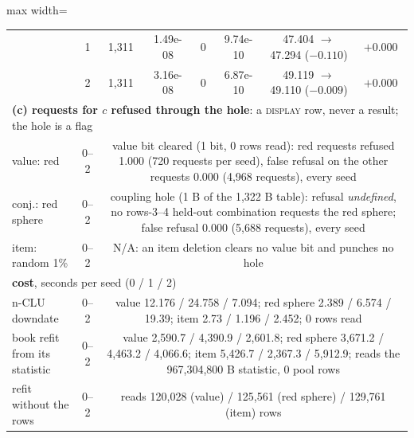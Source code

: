 \documentclass{article} %
\begin{document}
\begin{table}[t]
\begin{adjustbox}{max width=\linewidth}
\begin{tabular}{lccccccc}
 & 1 & 1,311 & 1.49e-08 & 0 & 9.74e-10 & 47.404 $\to$ 47.294 ($-0.110$) & $+0.000$ \\
 & 2 & 1,311 & 3.16e-08 & 0 & 6.87e-10 & 49.119 $\to$ 49.110 ($-0.009$) & $+0.000$ \\
\midrule
\multicolumn{8}{l}{\textbf{(c) requests for $c$ refused through the hole}: a \textsc{display} row, never a result; the hole is a flag} \\
value: red & 0--2 & \multicolumn{6}{p{10.6cm}}{value bit cleared (1 bit, 0 rows read): red requests refused 1.000 (720 requests per seed), false refusal on the other requests 0.000 (4,968 requests), every seed} \\
conj.: red sphere & 0--2 & \multicolumn{6}{p{10.6cm}}{coupling hole (1 B of the 1,322 B table): refusal \emph{undefined}, no rows-3--4 held-out combination requests the red sphere; false refusal 0.000 (5,688 requests), every seed} \\
item: random 1\% & 0--2 & \multicolumn{6}{p{10.6cm}}{N/A: an item deletion clears no value bit and punches no hole} \\
\midrule
\multicolumn{8}{l}{\textbf{cost}, seconds per seed (0 / 1 / 2)} \\
n-CLU downdate & 0--2 & \multicolumn{6}{p{10.6cm}}{value 12.176 / 24.758 / 7.094; red sphere 2.389 / 6.574 / 19.39; item 2.73 / 1.196 / 2.452; 0 rows read} \\
book refit from its statistic & 0--2 & \multicolumn{6}{p{10.6cm}}{value 2,590.7 / 4,390.9 / 2,601.8; red sphere 3,671.2 / 4,463.2 / 4,066.6; item 5,426.7 / 2,367.3 / 5,912.9; reads the 967,304,800 B statistic, 0 pool rows} \\
refit without the rows & 0--2 & \multicolumn{6}{p{10.6cm}}{reads 120,028 (value) / 125,561 (red sphere) / 129,761 (item) rows} \\
\bottomrule
\end{tabular}\end{adjustbox}
\end{table}
\end{document}
